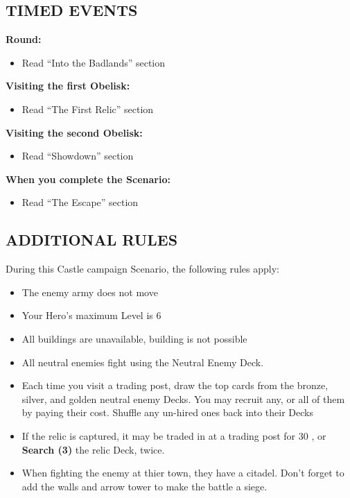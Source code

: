 \begin{multicols}{2}

\subsection*{\MakeUppercase{Timed Events}}

\textbf{ Round:}
\begin{itemize}
  \item Read ``Into the Badlands'' section
\end{itemize}

\textbf{Visiting the first Obelisk:}
\begin{itemize}
  \item Read ``The First Relic'' section
\end{itemize}

\textbf{Visiting the second Obelisk:}
\begin{itemize}
  \item Read ``Showdown'' section
\end{itemize}

\textbf{When you complete the Scenario:}
\begin{itemize}
  \item Read ``The Escape'' section
\end{itemize}



\subsection*{\MakeUppercase{Additional rules}}

During this Castle campaign Scenario, the following rules apply:

\begin{itemize}
  \item The enemy army does not move
  \item Your Hero's maximum Level is 6
  \item All buildings are unavailable, building is not possible
\end{itemize}

\columnbreak

\begin{itemize}
\item All neutral enemies fight using the Neutral Enemy Deck.
\item Each time you visit a trading post, draw the top cards from the  bronze,  silver, and  golden neutral enemy Decks. You may recruit any, or all of them by paying their cost. Shuffle any un-hired ones back into their Decks
\item If the relic is captured, it may be traded in at a trading post for 30 , or \textbf{Search (3)} the relic Deck, twice.
\item When fighting the enemy at thier town, they have a citadel. Don't forget to add the walls and arrow tower to make the battle a siege.
\end{itemize}

\end{multicols}

